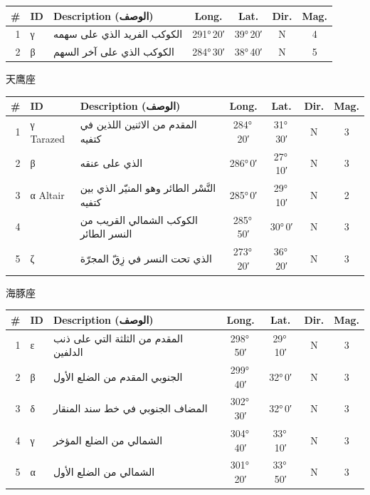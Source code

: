 \documentclass[9pt,a4paper]{extarticle}
\newcommand{\ar}[1]{{\arabicfont\textarabic{#1}}}
\begin{document}
\begin{longtable}{r l >{\raggedright\arraybackslash}p{6.7cm} c c c c}
\toprule \# & ID & Description (\ar{الوصف}) & Long. & Lat. & Dir. & Mag.\\ \midrule\endhead
1 & γ & \ar{الكوكب الفريد الذي على سهمه} & 291°\,20′ & 39°\,20′ & N & 4\\
2 & β & \ar{الكوكب الذي على آخر السهم} & 284°\,30′ & 38°\,40′ & N & 5\\
\bottomrule\end{longtable}
\vspace{4pt}\quad\ar{النسر الطائر}\quad 天鹰座
\begin{longtable}{r l >{\raggedright\arraybackslash}p{6.7cm} c c c c}
\toprule \# & ID & Description (\ar{الوصف}) & Long. & Lat. & Dir. & Mag.\\ \midrule\endhead
1 & γ Tarazed & \ar{المقدم من الاثنين اللذين في كتفيه} & 284°\,20′ & 31°\,30′ & N & 3\\
2 & β & \ar{الذي على عنقه} & 286°\,0′ & 27°\,10′ & N & 3\\
3 & α Altair & \ar{النَّسْر الطائر وهو المنيّر الذي بين كتفيه} & 285°\,0′ & 29°\,10′ & N & 2\\
4 &  & \ar{الكوكب الشمالي القريب من النسر الطائر} & 285°\,50′ & 30°\,0′ & N & 3\\
5 & ζ & \ar{الذي تحت النسر في زِقّ المجرّة} & 273°\,20′ & 36°\,20′ & N & 3\\
\bottomrule\end{longtable}
\vspace{4pt}\quad\ar{الدلفين}\quad 海豚座
\begin{longtable}{r l >{\raggedright\arraybackslash}p{6.7cm} c c c c}
\toprule \# & ID & Description (\ar{الوصف}) & Long. & Lat. & Dir. & Mag.\\ \midrule\endhead
1 & ε & \ar{المقدم من الثلثة التي على ذنب الدلفين} & 298°\,50′ & 29°\,10′ & N & 3\\
2 & β & \ar{الجنوبي المقدم من الضلع الأول} & 299°\,40′ & 32°\,0′ & N & 3\\
3 & δ & \ar{المضاف الجنوبي في خط سند المنقار} & 302°\,30′ & 32°\,0′ & N & 3\\
4 & γ & \ar{الشمالي من الضلع المؤخر} & 304°\,40′ & 33°\,10′ & N & 3\\
5 & α & \ar{الشمالي من الضلع الأول} & 301°\,20′ & 33°\,50′ & N & 3\\
\bottomrule\end{longtable}
\end{document}

